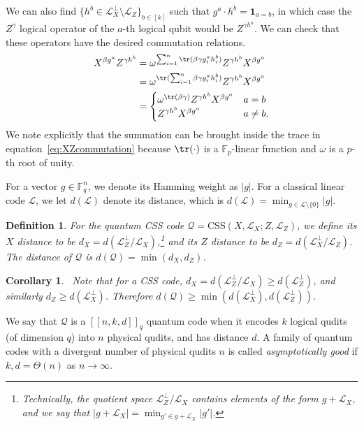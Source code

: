 \documentclass[11pt]{article}
\newtheorem{corollary}[theorem]{Corollary}
\newtheorem{definition}[theorem]{Definition}
\theoremstyle{definition}
\renewcommand{\ge}{\geqslant}
\newcommand{\CSS}{\text{CSS}}
\newcommand{\cL}{\mathcal{L}}
\newcommand{\one}{\boldsymbol{1}}
\newcommand{\qcode}{\mathcal{Q}}
\newcommand{\FF}{\mathbb{F}}
\begin{document}
We can also find $\{ h^b\in \cL_X^\perp\setminus \cL_Z \}_{b \in [k]}$ such that $g^a\cdot h^b = \one_{a=b}$, in which case
the $Z^\gamma$ logical operator of the $a$-th logical qubit would be $Z^{\gamma h^a}$. 
We can check that these operators have the desired commutation relations.
\begin{align}
    X^{\beta g^a}Z^{\gamma h^b} 
    &= \omega^{\sum_{i=1}^n\tr(\beta\gamma g^a_ih^b_i)}
    Z^{\gamma h^b}X^{\beta g^a} \\ 
    &= \omega^{\tr(\sum_{i=1}^n \beta\gamma g^a_ih^b_i)}
    Z^{\gamma h^b}X^{\beta g^a}\label{eq:XZcommutation}  \\ 
    &= \begin{cases}
        \omega^{\tr(\beta\gamma)} Z^{\gamma h^b}X^{\beta g^a} & a = b \\
        Z^{\gamma h^b}X^{\beta g^a} & a \not= b.
    \end{cases} 
\end{align}
We note explicitly that the summation can be brought inside the trace in equation~\eqref{eq:XZcommutation} because $\tr(\cdot)$ is a $\FF_p$-linear function and $\omega$ is a $p$-th root of unity. 

For a vector $g\in \FF_q^n$, we denote its Hamming weight as $|g|$. 
For a classical linear code $\cL$, we let $d(\cL)$ denote its distance, which is 
$d(\cL) = \min_{g\in \cL\setminus\{0\}} |g|$.

\begin{definition}
For the quantum CSS code $\qcode = \CSS(X, \cL_X; Z, \cL_Z)$, we define its $X$ distance to be $d_X = d(\cL_Z^\perp/\cL_X)$,\footnote{Technically, the quotient space $\cL_Z^\perp/\cL_X$ contains elements of the form $g + \cL_X$, and we say that $|g + \cL_X| = \min_{g'\in g + \cL_X} |g'|$.} and its $Z$ distance to be $d_Z = d(\cL_X^\perp/\cL_Z)$. 
The distance of $\qcode$ is $d(\qcode) = \min(d_X, d_Z)$. 
\end{definition}
\begin{corollary}~\label{cor:CSS_distance}
    Note that for a CSS code, $d_X = d(\cL_Z^\perp/\cL_X)\ge d(\cL_Z^\perp)$, and similarly $d_Z\ge d(\cL_X^\perp)$. 
    Therefore $d(\qcode)\ge \min(d(\cL_X^\perp), d(\cL_Z^\perp))$.
\end{corollary}
We say that $\qcode$ is a $[[n, k, d]]_q$ quantum code when it encodes $k$ logical qudits (of dimension $q$) into $n$ physical qudits, and has distance $d$.
A family of quantum codes with a divergent number of physical qudits $n$ is called \textit{asymptotically good} if $k, d = \Theta(n)$ as $n\rightarrow \infty$. 
\end{document}
